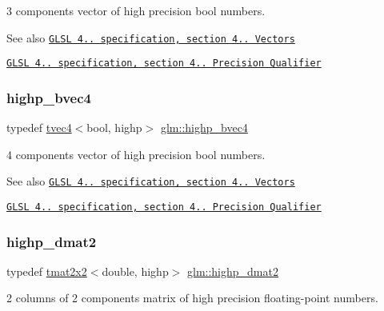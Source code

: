 3 components vector of high precision bool numbers.

\begin{DoxySeeAlso}{See also}
\href{http://www.opengl.org/registry/doc/GLSLangSpec.4.20.8.pdf}{\tt G\+L\+SL 4.. specification, section 4.. Vectors} 

\href{http://www.opengl.org/registry/doc/GLSLangSpec.4.20.8.pdf}{\tt G\+L\+SL 4.. specification, section 4.. Precision Qualifier} 
\end{DoxySeeAlso}
\mbox{\label{group__core__precision_ga12155cf93fb8fea5d9c4c7e2d72aed4e}} 
\subsubsection{\texorpdfstring{highp\+\_\+bvec4}{highp\_bvec4}}
{\footnotesize\ttfamily typedef \hyperlink{structglm_1_1tvec4}{tvec4}$<$bool, highp$>$ \hyperlink{group__core__precision_ga12155cf93fb8fea5d9c4c7e2d72aed4e}{glm\+::highp\+\_\+bvec4}}

4 components vector of high precision bool numbers.

\begin{DoxySeeAlso}{See also}
\href{http://www.opengl.org/registry/doc/GLSLangSpec.4.20.8.pdf}{\tt G\+L\+SL 4.. specification, section 4.. Vectors} 

\href{http://www.opengl.org/registry/doc/GLSLangSpec.4.20.8.pdf}{\tt G\+L\+SL 4.. specification, section 4.. Precision Qualifier} 
\end{DoxySeeAlso}
\mbox{\label{group__core__precision_ga08cc902dad76205cd28a80bf695814a7}} 
\subsubsection{\texorpdfstring{highp\+\_\+dmat2}{highp\_dmat2}}
{\footnotesize\ttfamily typedef \hyperlink{structglm_1_1tmat2x2}{tmat2x2}$<$double, highp$>$ \hyperlink{group__core__precision_ga08cc902dad76205cd28a80bf695814a7}{glm\+::highp\+\_\+dmat2}}

2 columns of 2 components matrix of high precision floating-\/point numbers.

